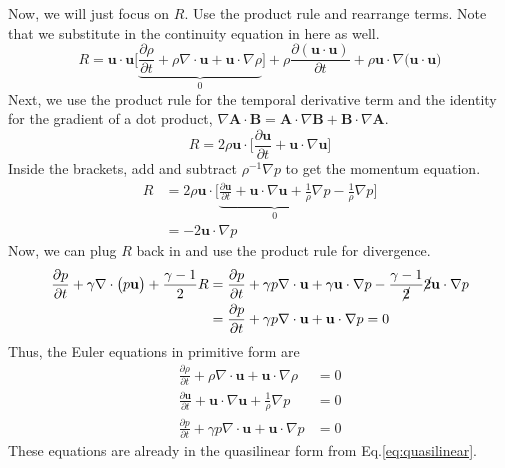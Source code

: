 \documentclass{report}
\begin{document}
Now, we will just focus on $R$. Use the product rule and rearrange terms. Note that we substitute in the continuity equation in here as well.
\begin{equation}
	R = \mathbf{u}\cdot \mathbf{u} \Bigg[ \underbrace{ \frac{\partial \rho}{\partial t} + \rho \nabla \cdot \mathbf{u}+ \mathbf{u} \cdot \nabla \rho}_{0} \Bigg]
+ \rho \frac{\partial (\mathbf{u} \cdot \mathbf{u} )}{\partial t} + \rho \mathbf{u}\cdot \nabla \big(\mathbf{u}\cdot \mathbf{u} \big)
\end{equation}
Next, we use the product rule for the temporal derivative term and the identity for the gradient of a dot product, $\nabla \mathbf{A}\cdot \mathbf{B} = \mathbf{A}\cdot \nabla \mathbf{B}+ \mathbf{B}\cdot \nabla \mathbf{A}$.
\begin{equation}
	R = 2 \rho \mathbf{u} \cdot \Bigg[ \frac{\partial \mathbf{u}}{\partial t} + \mathbf{u} \cdot \nabla \mathbf{u} \Bigg]
\end{equation}
Inside the brackets, add and subtract $\rho^{-1} \nabla p$ to get the momentum equation.
\begin{align}
	R &= 2 \rho \mathbf{u} \cdot \Bigg[ \underbrace{\frac{\partial \mathbf{u}}{\partial t} + \mathbf{u} \cdot \nabla \mathbf{u} + \frac{1}{\rho} \nabla p }_{0}- \frac{1}{\rho }\nabla p \Bigg] \\
	&= - 2 \mathbf{u}\cdot \nabla p
\end{align}
Now, we can plug $R$ back in and use the product rule for divergence.
\begin{align}
	\frac{\partial p}{\partial t} + \gamma \nabla \cdot \big(p \mathbf{u} \big) 
	+ \frac{\gamma-1}{2} R &= 
	\frac{\partial p}{\partial t} + \gamma p \nabla \cdot \mathbf{u} + \gamma \mathbf{u}\cdot \nabla p 
	- \frac{\gamma-1}{\cancel{2}} \cancel{2} \mathbf{u}\cdot \nabla p \\
	&= \frac{\partial p}{\partial t} + \gamma p \nabla \cdot \mathbf{u} + \mathbf{u}\cdot \nabla p = 0
\end{align}
Thus, the Euler equations in primitive form are
\begin{align}
	\frac{\partial \rho}{\partial t} + \rho \nabla \cdot \mathbf{u}+ \mathbf{u} \cdot \nabla \rho &= 0\\
	\frac{\partial \mathbf{u}}{\partial t} + \mathbf{u} \cdot \nabla \mathbf{u}+ \frac{1}{\rho} \nabla p &= 0 \\
	\frac{\partial p}{\partial t} + \gamma p \nabla \cdot \mathbf{u} + \mathbf{u}\cdot \nabla p &= 0
\end{align}
These equations are already in the quasilinear form from Eq.\ref{eq:quasilinear}. 
\end{document}
